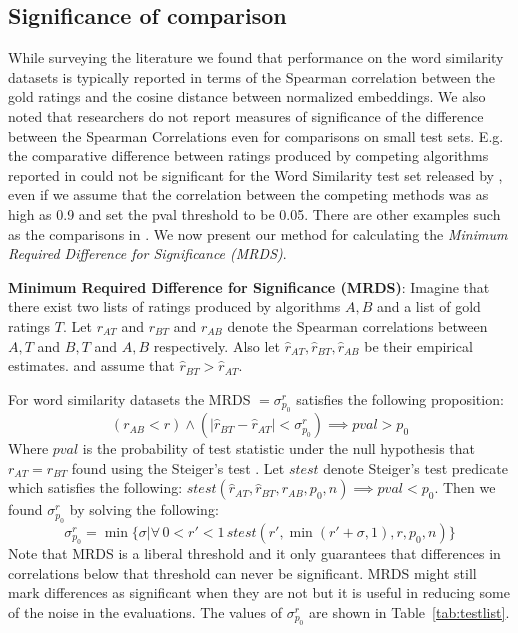 \documentclass[11pt]{article}
\begin{document}
\subsection{Significance of comparison} \label{ssec:mdrs}
While surveying the literature
we found that performance on the word similarity datasets is typically
reported in terms of the Spearman correlation between the gold ratings
and the cosine distance between normalized embeddings.
We also noted that researchers do not report
measures of significance of the difference between
the Spearman Correlations even for comparisons on small test sets.
E.g. the comparative difference between ratings produced by competing
algorithms reported in \cite{faruqui2014retrofitting}  
could not be significant for the Word Similarity test set released by
,
even if we assume that the correlation between the competing methods was as high as 0.9 and set the
pval threshold to be 0.05. There are other examples such as the
comparisons in \cite{hill2014not}. We now present our method for calculating the
\emph{Minimum Required Difference for Significance (MRDS)}.

\noindent\textbf{Minimum Required Difference for Significance (MRDS)}:
Imagine that there exist two lists of ratings produced by algorithms $A, B$ and a list of gold
ratings $T$. Let $r_{AT}$ and $r_{BT}$ and $r_{AB}$ denote the
Spearman correlations between $A, T$ and $B, T$ and $A, B$ respectively. Also let
$\hat{r}_{AT}, \hat{r}_{BT}, \hat{r}_{AB}$ be their empirical
estimates. and assume that $\hat{r}_{BT} > \hat{r}_{AT}$.

For word similarity datasets the MRDS $=\sigma_{p_0}^r$ satisfies the following proposition:
{\small $$ (r_{AB} < r) \land (|\hat{r}_{BT} - \hat{r}_{AT}|{<}\sigma_{p_0}^r)
  {\implies} \textit{pval} > p_0$$}
Where $\textit{pval}$ is the probability of test statistic under the
null hypothesis that $r_{AT} = r_{BT}$ found using the Steiger's test \cite{steiger1980tests}.
Let $\textit{stest}$
denote Steiger's test predicate which satisfies the following:
$\textit{stest}(\hat{r}_{AT}, \hat{r}_{BT}, r_{AB}, p_0, n)
{\implies} \textit{pval} < p_0$. Then we found
$\sigma_{p_0}^r$ by solving the following:
{\small $$\sigma_{p_0}^r = \min\{\sigma | \forall\, 0 {<} r' {<} 1\, \textit{stest}(r',
\min(r'+\sigma, 1), r, p_0, n) \} $$}
Note that MRDS is a liberal threshold and it only guarantees that
differences in correlations below that threshold can never be
significant. MRDS might still mark differences as significant
when they are not but it is useful in reducing some of the noise in
the evaluations.  The values of $\sigma_{p_0}^r$ are shown in
Table~\ref{tab:testlist}.
\end{document}
